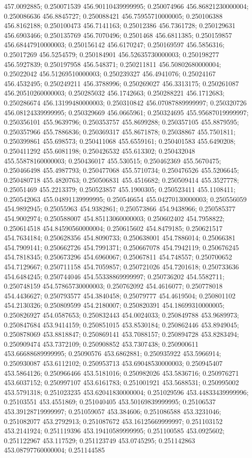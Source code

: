 457.0092885; 0.250071539 456.90110439999995; 0.250074966 456.86821230000004; 0.250086636 456.8845727; 0.250088421 456.75955710000005; 0.250106388 456.8162188; 0.250100473 456.7141163; 0.25012386 456.7361728; 0.250129631 456.6903466; 0.250135769 456.7070496; 0.2501468 456.6811385; 0.250159857 456.68447910000003; 0.250156142 456.6170247; 0.250169597 456.5856316; 0.25017269 456.5254579; 0.250184901 456.52635730000003; 0.250198277 456.5927839; 0.250197958 456.548371; 0.250211811 456.50802680000004; 0.25022042 456.51269510000003; 0.250239327 456.4941076; 0.25024167 456.4532495; 0.250249211 456.3788996; 0.250269027 456.3313175; 0.250261087 456.20510260000003; 0.250285032 456.1742663; 0.250288221 456.1712683; 0.250286674 456.13199480000003; 0.250310842 456.07087889999997; 0.250320726 456.08124339999995; 0.250329669 456.0665961; 0.250324695 455.95687019999997; 0.250356101 455.9639796; 0.250353757 455.8699288; 0.250357105 455.8879595; 0.250357966 455.7886836; 0.250369317 455.8671878; 0.25038867 455.7501811; 0.250399861 455.698573; 0.250411068 455.6559161; 0.250401583 455.6490208; 0.250411292 455.6081198; 0.250426532 455.613302; 0.250432048 455.55878160000003; 0.250436017 455.530515; 0.250462369 455.5670475; 0.250466498 455.4987793; 0.250477068 455.5710734; 0.250476526 455.5206645; 0.250480718 455.4820763; 0.250506831 455.4516682; 0.250509414 455.3527778; 0.25051469 455.2213379; 0.250523857 455.1900305; 0.250523411 455.1108411; 0.250542063 455.04891139999995; 0.250546654 455.04270130000003; 0.250556059 454.9892945; 0.25055963 454.9382861; 0.250573866 454.9438966; 0.250585377 454.9002974; 0.250588007 454.85113060000003; 0.250602402 454.7958822; 0.250614518 454.84590560000004; 0.250615602 454.8479185; 0.250621517 454.7634184; 0.250628356 454.8090733; 0.250638001 454.7886014; 0.25066381 454.7909141; 0.250662726 454.7991371; 0.250667078 454.7942119; 0.250676245 454.7818345; 0.250673296 454.6960067; 0.25067811 454.748557; 0.250700652 454.7129667; 0.250711158 454.7059857; 0.250721026 454.7201618; 0.250733636 454.6484245; 0.250744046 454.55338869999997; 0.250736202 454.5582711; 0.250748159 454.57865730000003; 0.250762092 454.4616077; 0.250778018 454.4436627; 0.250793577 454.3840458; 0.25079777 454.4619504; 0.250801102 454.2130326; 0.250809599 454.2180007; 0.250820391 454.18699310000005; 0.250826927 454.0587653; 0.250832443 454.0024033; 0.250849788 453.9689973; 0.250847684 453.9414159; 0.250851015 453.8530184; 0.250862446 453.8949045; 0.250878069 453.8818847; 0.250869141 453.7088157; 0.250894728 453.8283494; 0.250909474 453.7372109; 0.250908852 453.7307438; 0.250900611 453.66688689999995; 0.25090576 453.6862881; 0.250935922 453.5966914; 0.250930087 453.6112102; 0.250953713 453.69048530000003; 0.250945407 453.5864126; 0.250966466 453.5181016; 0.250982026 453.5836716; 0.250976271 453.6037152; 0.250997107 453.6161783; 0.251001921 453.5688531; 0.250995002 453.5791318; 0.251023235 453.62041830000004; 0.251029596 453.44833439999996; 0.25103551 453.4551869; 0.251040405 453.50169839999995; 0.25106537 453.39128719999997; 0.251059057 453.384606; 0.251086588 453.3231046; 0.251082077 453.2792913; 0.251087672 453.16125669999997; 0.251103152 453.2141924; 0.251119396 453.19410589999995; 0.251100585 453.0925602; 0.251122967 453.117529; 0.251123749 453.0745295; 0.251142863 453.08797760000004; 0.251144585 
